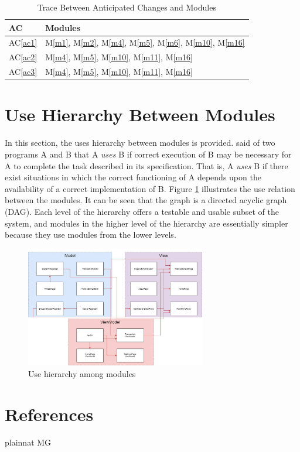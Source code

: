 \documentclass[12pt, titlepage]{article}
\newcommand{\acref}[1]{AC\ref{#1}}
\newcommand{\mref}[1]{M\ref{#1}}
\begin{document}
\begin{table}[H]
\centering
\begin{tabular}{p{} p{}}
\toprule
\textbf{AC} & \textbf{Modules}\\
\midrule
\acref{ac1} & \mref{m1}, \mref{m2}, \mref{m4}, \mref{m5}, \mref{m6}, \mref{m10}, \mref{m16}\\
\acref{ac2} & \mref{m4}, \mref{m5}, \mref{m10}, \mref{m11}, \mref{m16}\\
\acref{ac3} & \mref{m4}, \mref{m5}, \mref{m10}, \mref{m11}, \mref{m16}\\
\bottomrule
\end{tabular}
\caption{Trace Between Anticipated Changes and Modules}
\label{TblACT}
\end{table}

\section{Use Hierarchy Between Modules} \label{SecUse}

In this section, the uses hierarchy between modules is
provided. \citet{Parnas1978} said of two programs A and B that A {\em uses} B if
correct execution of B may be necessary for A to complete the task described in
its specification. That is, A {\em uses} B if there exist situations in which
the correct functioning of A depends upon the availability of a correct
implementation of B.  Figure \ref{FigUH} illustrates the use relation between
the modules. It can be seen that the graph is a directed acyclic graph
(DAG). Each level of the hierarchy offers a testable and usable subset of the
system, and modules in the higher level of the hierarchy are essentially simpler
because they use modules from the lower levels.

\begin{figure}[H]
\centering
\includegraphics[width=0.7\textwidth]{UsesHierarchy.png}
\caption{Use hierarchy among modules}
\label{FigUH}
\end{figure}

\section*{References}

 {plainnat}
 {MG}
\end{document}
